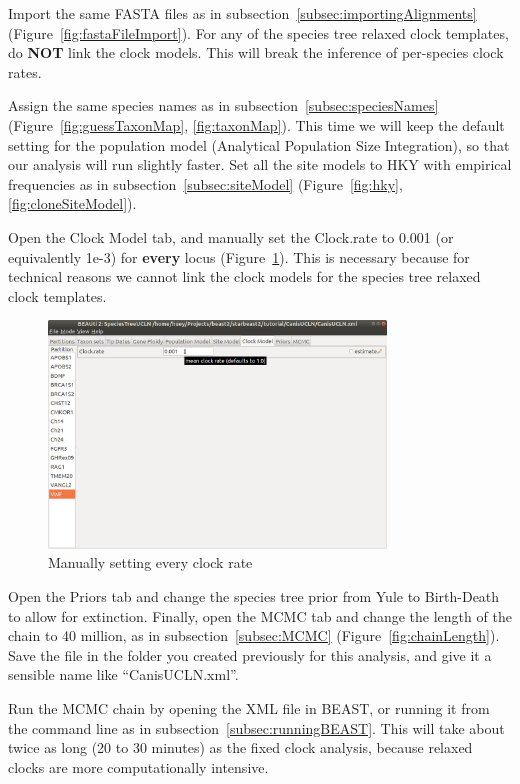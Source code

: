 \documentclass[12pt]{article}
\begin{document}
Import the same FASTA files as in
subsection~\ref{subsec:importingAlignments}
(Figure~\ref{fig:fastaFileImport}). For any of the species tree relaxed clock
templates, do \textbf{NOT} link the clock models. This will break the inference
of per-species clock rates.

Assign the same species names as in
subsection~\ref{subsec:speciesNames} (Figure~\ref{fig:guessTaxonMap}, \ref{fig:taxonMap}). This time
we will keep the default setting for the population model (Analytical Population
Size Integration), so that our analysis will run slightly faster. Set all
the site models to HKY with empirical frequencies as in
subsection~\ref{subsec:siteModel} (Figure~\ref{fig:hky}, \ref{fig:cloneSiteModel}).

Open the Clock Model tab, and manually set the Clock.rate to 0.001 (or
equivalently 1e-3) for \textbf{every} locus (Figure~\ref{fig:uclnClockRates}).
This is necessary because for technical reasons we cannot link the clock
models for the species tree relaxed clock templates.

\begin{figure}[htb!]
\centering
\includegraphics[width=0.8\textwidth]{figures/uclnClockRates.png}
\caption
{Manually setting every clock rate}
\label{fig:uclnClockRates}
\end{figure}

Open the Priors tab and change the species tree prior from Yule to Birth-Death
to allow for extinction. Finally, open the MCMC tab and change the length of
the chain to 40 million, as in subsection~\ref{subsec:MCMC}
(Figure~\ref{fig:chainLength}). Save the file in the folder you created
previously for this analysis, and give it a sensible name like ``CanisUCLN.xml''.

Run the MCMC chain by opening the XML file in BEAST, or running it from
the command line as in subsection~\ref{subsec:runningBEAST}. This will
take about twice as long (20 to 30 minutes) as the fixed clock analysis,
because relaxed clocks are more computationally intensive.
\end{document}
